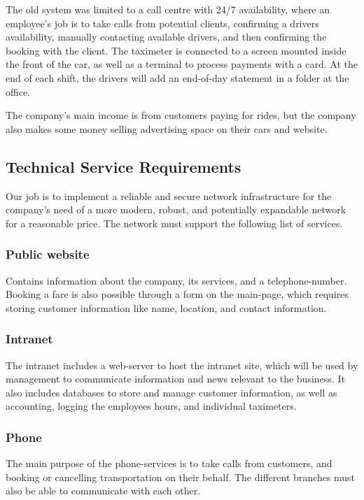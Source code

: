 The old system was limited to a call centre with 24/7 availability, where an employee's job is to take calls from potential clients, confirming a drivers availability, manually contacting available drivers, and then confirming the booking with the client. The taximeter is connected to a screen mounted inside the front of the car, as well as a terminal to process payments with a card. At the end of each shift, the drivers will add an end-of-day statement in a folder at the office. 

The company's main income is from customers paying for rides, but the company also makes some money selling advertising space on their cars and website.

\subsection{Technical Service Requirements}
Our job is to implement a reliable and secure network infrastructure for the company's need of a more modern, robust, and potentially expandable network for a reasonable price. 
The network must support the following list of services.

\subsubsection{Public website}
Contains information about the company, its services, and a telephone-number. 
Booking a fare is also possible through a form on the main-page, which requires storing customer information like name, location, and contact information.

\subsubsection{Intranet}
The intranet includes a web-server to host the intranet site, which will be used by management to communicate information and news relevant to the business. 
It also includes databases to store and manage customer information, as well as accounting, logging the employees hours, and individual taximeters.

\subsubsection{Phone}
The main purpose of the phone-services is to take calls from customers, and booking or cancelling transportation on their behalf. The different branches must also be able to communicate with each other.

